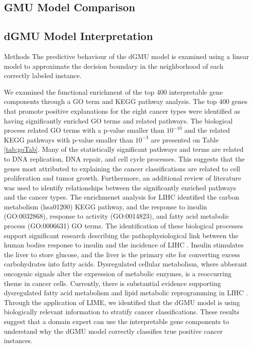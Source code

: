 \subsection{GMU Model Comparison}\label{subsec:gmuComp}

\subsection{dGMU Model Interpretation}\label{subsec:dgmuInt}

Methods
The predictive behaviour of the dGMU model is examined using a linear model to approximate the decision boundary in the neighborhood of each correctly labeled instance.

We examined the functional enrichment of the top 400 interpretable gene components through a GO term and KEGG pathway analysis. The top 400 genes that promote positive explanations for the eight cancer types were identified as having significantly enriched GO terms and related pathways. The biological process related GO terms with a p-value smaller than $10^{-10}$ and the related KEGG pathways with p-value smaller than $10^{-3}$ are presented on Table \ref{tab:goTab}. Many of the statistically significant pathways and terms are related to DNA replication, DNA repair, and cell cycle processes. This suggests that the genes most attributed to explaining the cancer classifications are related to cell proliferation and tumor growth. Furthermore, an additional review of literature was used to identify relationships between the significantly enriched pathways and the cancer types. The enrichmenet analysis for LIHC identified the carbon metabolism (hsa01200) KEGG pathway, and the response to insulin (GO:0032868), response to activity (GO:0014823), and fatty acid metabolic process (GO:0006631) GO terms. The identification of these biological processes support significant research describing the pathophysiological link between the human bodies response to insulin and the incidence of LIHC \cite{li2017diabetes,singh2018diabetes}. Insulin stimulates the liver to store glucose, and the liver is the primary site for converting excess carbohydrates into fatty acids. Dysregulated cellular metabolism, where abberant oncogenic signals alter the expression of metabolic enzymes, is a reoccurring theme in cancer cells. Currently, there is substantial evidence supporting dysregulated fatty acid metabolism and lipid metabolic reprogramming in LIHC \cite{wang2016dysregulated,nakagawa2018lipid}. Through the application of LIME, we identified that the dGMU model is using biologically relevant information to stratify cancer classifications. These results suggest that a domain expert can use the interpretable gene components to understand why the dGMU model correctly classifies true positive cancer instances.\\

